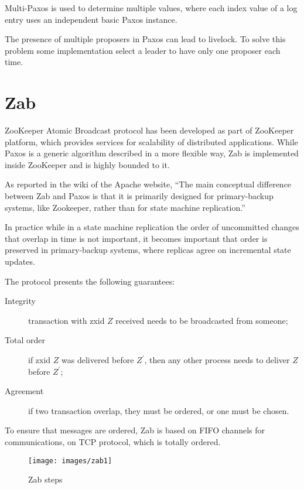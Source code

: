 Multi-Paxos is used to determine multiple values, where each index value of a log entry uses an independent basic Paxos instance.

The presence of multiple proposers in Paxos can lead to livelock. To solve this problem some implementation select a leader to have only one proposer each time.

\section{Zab\label{sec:zab}}

ZooKeeper Atomic Broadcast protocol has been developed as part of ZooKeeper platform, which provides services for scalability of distributed applications.
While Paxos is a generic algorithm described in a more flexible way, Zab is implemented inside ZooKeeper and is highly bounded to it.

As reported in the wiki of the Apache website, ``The main conceptual difference between Zab and Paxos is that it is primarily designed for primary-backup systems, like Zookeeper, rather than for state machine replication.''

In practice while in a state machine replication the order of uncommitted changes that overlap in time is not important, it becomes important that order is preserved in primary-backup systems, where replicas agree on incremental state updates.

The protocol presents the following guarantees:
\begin{description}
    \item[Integrity] transaction with zxid $Z$ received needs to be broadcasted from someone;
    \item[Total order] if zxid $Z$ was delivered before $Z^{'}$, then any other process needs to deliver $Z$ before $Z^{'}$;
    \item[Agreement] if two transaction overlap, they must be ordered, or one must be chosen.
\end{description}

To ensure that messages are ordered, Zab is based on FIFO channels for communications, on TCP protocol, which is totally ordered.

\begin{figure}[H]
    \centering
    \texttt{[image: images/zab1]}
    \caption{Zab steps}
    \label{fig:zab}
\end{figure}

\clearpage

